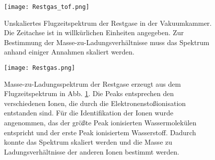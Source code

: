 \begin{figure}
    \centering
    \hspace*{-.8cm}
    \texttt{[image: Restgas\_tof.png]}
    \caption[Flugzeitspektrum der Restgase]{Unskaliertes Flugzeitspektrum der Restgase in der Vakuumkammer. Die Zeitachse ist in willkürlichen Einheiten angegeben. Zur Bestimmung der Masse-zu-Ladungsverhältnisse muss das Spektrum anhand einiger Annahmen skaliert werden.}
    \label{fig:rest_tof}
\end{figure}

\begin{figure}
    \centering
    \hspace*{-1cm}
    \texttt{[image: Restgas.png]}
    \caption[Masse-zu-Ladungsspektrum der Restgase]{Masse-zu-Ladungsspektrum der Restgase erzeugt aus dem Flugzeitspektrum in Abb. \ref{fig:rest_tof}. Die Peaks entsprechen den verschiedenen Ionen, die durch die Elektronenstoßionisation entstanden sind. Für die Identifikation der Ionen wurde angenommen, das der größte Peak ionisierten Wassermolekülen entspricht und der erste Peak ionisiertem Wasserstoff. Dadurch konnte das Spektrum skaliert werden und die Masse zu Ladungsverhältnisse der anderen Ionen bestimmt werden.}
    \label{fig:rest}
\end{figure}